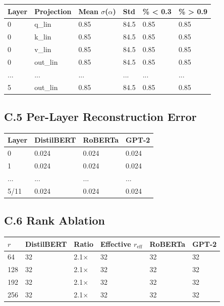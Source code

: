 \begin{table}[H]
\centering
\small
\begin{tabular}{llllll}
\toprule
\textbf{Layer} & \textbf{Projection} & \textbf{Mean $\sigma$($\alpha$)} & \textbf{Std} & \textbf{\% \textless{} 0.3} & \textbf{\% \textgreater{} 0.9} \\
\midrule
0 & q\_lin & 0.85 & 84.5 & 0.85 & 0.85 \\
0 & k\_lin & 0.85 & 84.5 & 0.85 & 0.85 \\
0 & v\_lin & 0.85 & 84.5 & 0.85 & 0.85 \\
0 & out\_lin & 0.85 & 84.5 & 0.85 & 0.85 \\
... & ... & ... & ... & ... & ... \\
5 & out\_lin & 0.85 & 84.5 & 0.85 & 0.85 \\
\bottomrule
\end{tabular}
\end{table}

\subsection{C.5 Per-Layer Reconstruction Error}

\begin{table}[H]
\centering
\small
\begin{tabular}{llll}
\toprule
\textbf{Layer} & \textbf{DistilBERT} & \textbf{RoBERTa} & \textbf{GPT-2} \\
\midrule
0 & 0.024 & 0.024 & 0.024 \\
1 & 0.024 & 0.024 & 0.024 \\
... & ... & ... & ... \\
5/11 & 0.024 & 0.024 & 0.024 \\
\bottomrule
\end{tabular}
\end{table}

\subsection{C.6 Rank Ablation}

\begin{table}[H]
\centering
\small
\begin{tabular}{llllll}
\toprule
\textbf{$r$} & \textbf{DistilBERT} & \textbf{Ratio} & \textbf{Effective $r_\text{eff}$} & \textbf{RoBERTa} & \textbf{GPT-2} \\
\midrule
64 & 32 & 2.1$\times$ & 32 & 32 & 32 \\
128 & 32 & 2.1$\times$ & 32 & 32 & 32 \\
192 & 32 & 2.1$\times$ & 32 & 32 & 32 \\
256 & 32 & 2.1$\times$ & 32 & 32 & 32 \\
\bottomrule
\end{tabular}
\end{table}

